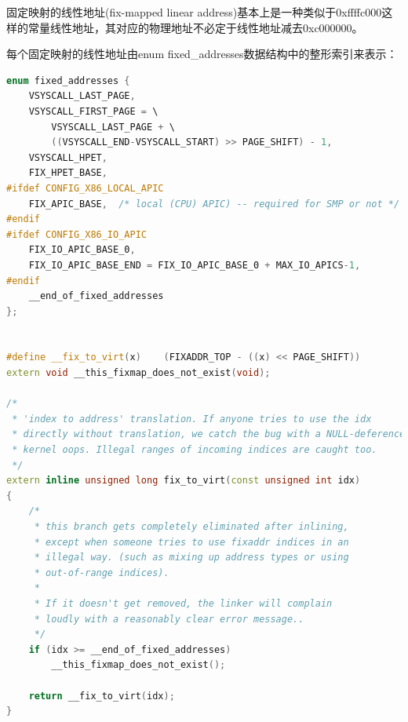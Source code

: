     固定映射的线性地址(fix-mapped linear address)基本上是一种类似于0xffffc000这样的常量线性地址，其对应的物理地址不必定于线性地址减去0xc000000。

    每个固定映射的线性地址由enum fixed\_addresses数据结构中的整形索引来表示：

\begin{lstlisting}[language=C++]
enum fixed_addresses {
    VSYSCALL_LAST_PAGE,
    VSYSCALL_FIRST_PAGE = \
        VSYSCALL_LAST_PAGE + \
        ((VSYSCALL_END-VSYSCALL_START) >> PAGE_SHIFT) - 1,
    VSYSCALL_HPET,
    FIX_HPET_BASE,
#ifdef CONFIG_X86_LOCAL_APIC
    FIX_APIC_BASE,	/* local (CPU) APIC) -- required for SMP or not */
#endif
#ifdef CONFIG_X86_IO_APIC
    FIX_IO_APIC_BASE_0,
    FIX_IO_APIC_BASE_END = FIX_IO_APIC_BASE_0 + MAX_IO_APICS-1,
#endif
    __end_of_fixed_addresses
};


#define __fix_to_virt(x)	(FIXADDR_TOP - ((x) << PAGE_SHIFT))
extern void __this_fixmap_does_not_exist(void);

/*
 * 'index to address' translation. If anyone tries to use the idx
 * directly without translation, we catch the bug with a NULL-deference
 * kernel oops. Illegal ranges of incoming indices are caught too.
 */
extern inline unsigned long fix_to_virt(const unsigned int idx)
{
	/*
	 * this branch gets completely eliminated after inlining,
	 * except when someone tries to use fixaddr indices in an
	 * illegal way. (such as mixing up address types or using
	 * out-of-range indices).
	 *
	 * If it doesn't get removed, the linker will complain
	 * loudly with a reasonably clear error message..
	 */
	if (idx >= __end_of_fixed_addresses)
		__this_fixmap_does_not_exist();

    return __fix_to_virt(idx);
}
\end{lstlisting}


